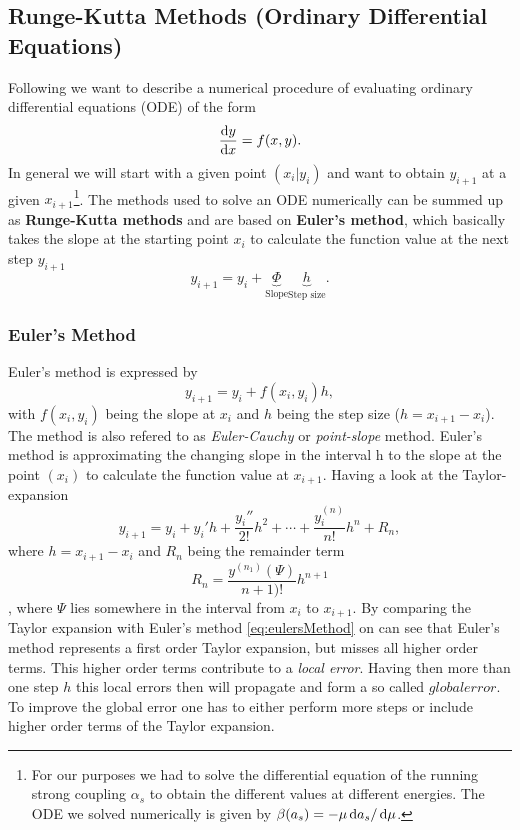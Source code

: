 \subsection{Runge-Kutta Methods (Ordinary Differential Equations)}
Following \cite{Chapra2015} we want to describe a numerical procedure of evaluating ordinary differential equations (ODE) of the form
\begin{equation}
	\frac{\mathop{}\!\mathrm{d} y}{\mathop{}\!\mathrm{d} x} = f(x,y).
\end{equation}
In general we will start with a given point $(x_i | y_i)$ and want to obtain $y_{i+1}$ at a given $x_{i+1}$\footnote{For our purposes we had to solve the differential equation of the running strong coupling $\alpha_s$ to obtain the different values at different energies. The ODE we solved numerically is given by $\beta(a_s) = - \mu \mathop{}\!\mathrm{d} a_s / \mathop{}\!\mathrm{d} \mu$.}. The methods used to solve an ODE numerically can be summed up as \textbf{Runge-Kutta methods} and are based on \textbf{Euler's method}, which basically takes the slope at the starting point $x_i$ to calculate the function value at the next step $y_{i+1}$
\begin{equation}
	y_{i+1} = y_i + \underbrace{\Phi}_{\text{Slope}} \underbrace{h}_{\text{Step size}}.
\end{equation}
\subsubsection{Euler's Method}
Euler's method is expressed by
\begin{equation}
	\label{eq:eulersMethod}
	y_{i+1} = y_i + f(x_i, y_i) h,
\end{equation}
with $f(x_i, y_i)$ being the slope at $x_i$ and $h$ being the step size ($h=x_{i+1} - x_{i}$). The method is also refered to as \textit{Euler-Cauchy} or \textit{point-slope} method. Euler's method is approximating the changing slope in the interval h to the slope at the point $(x_i)$ to calculate the function value at $x_{i+1}$. 
Having a look at the Taylor-expansion
\begin{equation}
	y_{i+1} = y_i + y_i' h + \frac{y_i''}{2!} h^2 + \cdots + \frac{y_i^{(n)}}{n!} h^n + R_n,
\end{equation}
where $h=x_{i+1}-x_i$ and $R_n$ being the remainder term
\begin{equation}
	R_n = \frac{y^{(n_1)}(\Psi)}{n+1)!} h^{n+1}
\end{equation},
where $\Psi$ lies somewhere in the interval from $x_i$ to $x_{i+1}$. By comparing the Taylor expansion with Euler's method \eqref{eq:eulersMethod} on can see that Euler's method represents a first order Taylor expansion, but misses all higher order terms. This higher order terms contribute to a \textit{local error}. Having then more than one step $h$ this local errors then will propagate and form a so called $global error$. To improve the global error one has to either perform more steps or include higher order terms of the Taylor expansion.

